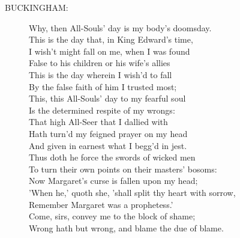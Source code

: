 \documentclass{article}
\begin{document}
\begin{description}
\item[BUCKINGHAM:] 
\hspace{1pt}Why, then All-Souls' day is my body's doomsday.\\
\hspace{1pt}This is the day that, in King Edward's time,\\
\hspace{1pt}I wish't might fall on me, when I was found\\
\hspace{1pt}False to his children or his wife's allies\\
\hspace{1pt}This is the day wherein I wish'd to fall\\
\hspace{1pt}By the false faith of him I trusted most;\\
\hspace{1pt}This, this All-Souls' day to my fearful soul\\
\hspace{1pt}Is the determined respite of my wrongs:\\
\hspace{1pt}That high All-Seer that I dallied with\\
\hspace{1pt}Hath turn'd my feigned prayer on my head\\
\hspace{1pt}And given in earnest what I begg'd in jest.\\
\hspace{1pt}Thus doth he force the swords of wicked men\\
\hspace{1pt}To turn their own points on their masters' bosoms:\\
\hspace{1pt}Now Margaret's curse is fallen upon my head;\\
\hspace{1pt}'When he,' quoth she, 'shall split thy heart with sorrow,\\
\hspace{1pt}Remember Margaret was a prophetess.'\\
\hspace{1pt}Come, sirs, convey me to the block of shame;\\
\hspace{1pt}Wrong hath but wrong, and blame the due of blame.\\
\end{description}
\centering{\it [Exeunt]}\\
\end{document}
